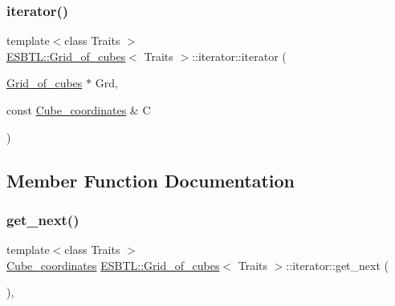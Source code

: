 \mbox{\label{classESBTL_1_1Grid__of__cubes_1_1iterator_a03419d0f3256eecdd89560a8e0bbea8c}} 
\subsubsection{\texorpdfstring{iterator()}{iterator()}\hspace{0.1cm}{\footnotesize\ttfamily [4/4]}}
{\footnotesize\ttfamily template$<$class Traits $>$ \\
\hyperlink{structESBTL_1_1Grid__of__cubes}{E\+S\+B\+T\+L\+::\+Grid\+\_\+of\+\_\+cubes}$<$ Traits $>$\+::iterator\+::iterator (\begin{DoxyParamCaption}\item[{\hyperlink{structESBTL_1_1Grid__of__cubes}{Grid\+\_\+of\+\_\+cubes} $\ast$}]{Grd,  }\item[{const \hyperlink{structESBTL_1_1Grid__of__cubes_ad55c84346bab961e08d95e494551d07d}{Cube\+\_\+coordinates} \&}]{C }\end{DoxyParamCaption})\hspace{0.3cm}{\ttfamily [inline]}}



\subsection{Member Function Documentation}
\mbox{\label{classESBTL_1_1Grid__of__cubes_1_1iterator_a8d881de503568216ba8f4ebef6b144f2}} 
\subsubsection{\texorpdfstring{get\+\_\+next()}{get\_next()}}
{\footnotesize\ttfamily template$<$class Traits $>$ \\
\hyperlink{structESBTL_1_1Grid__of__cubes_ad55c84346bab961e08d95e494551d07d}{Cube\+\_\+coordinates} \hyperlink{structESBTL_1_1Grid__of__cubes}{E\+S\+B\+T\+L\+::\+Grid\+\_\+of\+\_\+cubes}$<$ Traits $>$\+::iterator\+::get\+\_\+next (\begin{DoxyParamCaption}{ }\end{DoxyParamCaption})\hspace{0.3cm}{\ttfamily [inline]}, {\ttfamily [protected]}}

